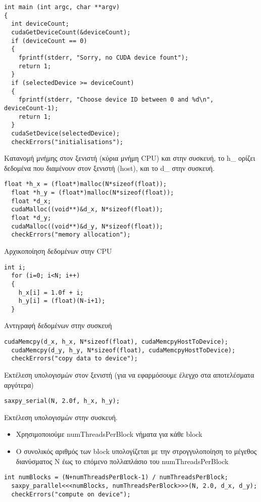 \begin{lstlisting}[basicstyle=\scriptsize]
int main (int argc, char **argv)
{
  int deviceCount;
  cudaGetDeviceCount(&deviceCount);
  if (deviceCount == 0)
  {
    fprintf(stderr, "Sorry, no CUDA device fount");
    return 1;
  }
  if (selectedDevice >= deviceCount)
  {
    fprintf(stderr, "Choose device ID between 0 and %d\n", deviceCount-1);
    return 1;
  }
  cudaSetDevice(selectedDevice);
  checkErrors("initialisations");  
\end{lstlisting}
Κατανομή μνήμης στον ξενιστή (κύρια μνήμη CPU) και στην συσκευή, το h\_ ορίζει δεδομένα που διαμένουν στον ξενιστή (host), και το d\_ στην συσκευή.
\begin{lstlisting}[basicstyle=\scriptsize]  
  float *h_x = (float*)malloc(N*sizeof(float));
  float *h_y = (float*)malloc(N*sizeof(float));
  float *d_x;
  cudaMalloc((void**)&d_x, N*sizeof(float));
  float *d_y;
  cudaMalloc((void**)&d_y, N*sizeof(float));
  checkErrors("memory allocation");

\end{lstlisting}
Αρχικοποίηση δεδομένων στην CPU
\begin{lstlisting}[basicstyle=\scriptsize]  
  int i;
  for (i=0; i<N; i++)
  {
    h_x[i] = 1.0f + i;
    h_y[i] = (float)(N-i+1);
  }

\end{lstlisting}
Αντιγραφή δεδομένων στην συσκευή
\begin{lstlisting}[basicstyle=\scriptsize]  
  cudaMemcpy(d_x, h_x, N*sizeof(float), cudaMemcpyHostToDevice);
  cudaMemcpy(d_y, h_y, N*sizeof(float), cudaMemcpyHostToDevice);
  checkErrors("copy data to device");
\end{lstlisting}
Εκτέλεση υπολογισμών στον ξενιστή (για να εφαρμόσουμε έλεγχο στα αποτελέσματα αργότερα)
\begin{lstlisting}[basicstyle=\scriptsize]  
  saxpy_serial(N, 2.0f, h_x, h_y);
\end{lstlisting}
Εκτέλεση υπολογισμών στην συσκευή.
\begin{itemize}
\item Χρησιμοποιούμε numThreadsPerBlock νήματα για κάθε block
\item Ο συνολικός αριθμός των block υπολογίζεται με την στρογγυλοποίηση το μέγεθος διανύσματος Ν έως το επόμενο πολλαπλάσιο του numThreadsPerBlock
\end{itemize}
\begin{lstlisting}[basicstyle=\scriptsize]  
  int numBlocks = (N+numThreadsPerBlock-1) / numThreadsPerBlock;
  saxpy_parallel<<<numBlocks, numThreadsPerBlock>>>(N, 2.0, d_x, d_y);
  checkErrors("compute on device");
\end{lstlisting}
